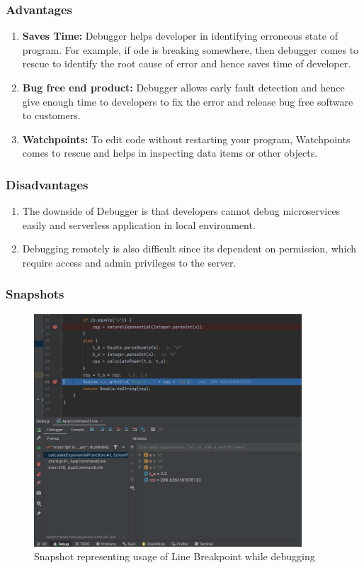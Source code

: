 \documentclass[a4paper,12pt]{report}
\begin{document}
\subsubsection{Advantages}
\begin{enumerate}
    \item \textbf{Saves Time:} Debugger helps developer in identifying erroneous state of program. For example, if ode is breaking somewhere, then debugger comes to rescue to identify the root cause of error and hence saves time of developer.
    \item \textbf{Bug free end product: } Debugger allows early fault detection and hence give enough time to developers to fix the error and release bug free software to customers.
    \item \textbf{Watchpoints: } To edit code without restarting your program, Watchpoints comes to rescue and helps in inspecting data items or other objects.
\end{enumerate}
\subsubsection{Disadvantages}
\begin{enumerate}
    \item The downside of Debugger is that developers cannot debug microservices easily and serverless application in local environment.\cite{b9}
    \item Debugging remotely is also difficult since its dependent on permission, which require access and admin privileges to the server.\cite{b9}
\end{enumerate}
\subsubsection{Snapshots}

\begin{figure}[h]
\centering
\includegraphics[width=10cm]{LineBreakpoint.png}
\caption{Snapshot representing usage of Line Breakpoint while debugging}
\label{exp}
\end{figure}
\end{document}
